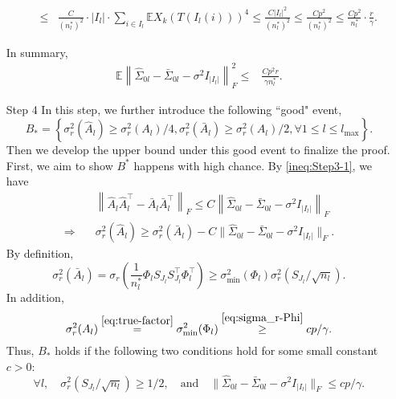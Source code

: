\documentclass[11pt]{article}
\newcommand{\0}{{\mathbf{0}}}
\newcommand{\1}{{\mathbf{1}}}
\begin{document}
\begin{enumerate}[leftmargin=*]
\begin{itemize}[leftmargin=*]
\begin{equation*}
\begin{split}
		\leq & \frac{C}{(n_l^\ast)^2} \cdot |I_l|\cdot  \sum_{i\in I_l} \mathbb{E} X_k(T(I_l(i)))^4 \leq \frac{C|I_l|^2}{(n_l^\ast)^2} \leq \frac{Cp^2}{(n_l^\ast)^2} \leq \frac{Cp^2}{n_l^\ast} \cdot \frac{r}{\gamma}.
		\end{split}
		\end{equation*}
	\end{itemize}
	In summary,
	\begin{equation}\label{ineq:hat_Sigma-Sigma-sigma}
	\begin{split}
	\mathbb{E}\left\|\hat{\Sigma}_{0l} - \bar{\Sigma}_{0l} - \sigma^2I_{|I_l|} \right\|_F^2 \leq & \frac{Cp^2r}{\gamma n_l^\ast}.
	\end{split}
	\end{equation}
	\item[Step 4] In this step, we further introduce the following ``good" event,
	\begin{equation}\label{eq:Bast-good-event}
	B_\ast = \left\{\sigma_r^2(\hat{A}_l) \geq \sigma_r^2(A_l)/4, \sigma_r^2(\bar{A}_l) \geq \sigma_r^2(A_l)/2, \forall 1\leq l\leq l_{\max}\right\}.
	\end{equation}
	Then we develop the upper bound under this good event to finalize the proof. First, we aim to show $B^\ast$ happens with high chance. By \eqref{ineq:Step3-1}, we have 
	\begin{equation*}
	\begin{split}
	& \left\|\hat{A}_l\hat{A}_l^\top - \bar{A}_l\bar{A}_l^\top\right\|_F \leq C\left\|\hat{\Sigma}_{0l} - \bar{\Sigma}_{0l} - \sigma^2 I_{|I_l|}\right\|_F\\
	\Rightarrow \quad & \sigma_r^2(\hat{A}_l) \geq \sigma_r^2(\bar{A}_l) - C\|\hat{\Sigma}_{0l} - \bar{\Sigma}_{0l} - \sigma^2 I_{|I_l|}\|_F.
	\end{split}
	\end{equation*}
	By definition, 
	$$\sigma_r^2(\bar{A}_l) = \sigma_r\left(\frac{1}{n_l^\ast}\Phi_l S_{J_l}S_{J_l}^\top \Phi_l^\top\right) \geq \sigma_{\min}^2(\Phi_l)\sigma_r^2(S_{J_l}/\sqrt{n_l}). $$
	In addition, 
	$$\sigma_r^2(A_l) \overset{\eqref{eq:true-factor}}{=} \sigma_{\min}^2(\Phi_l) \overset{\eqref{eq:sigma_r-Phi}}{\geq} cp/\gamma.$$
	Thus, $B_\ast$ holds if the following two conditions hold for some small constant $c>0$:
	\begin{equation}\label{eq:condition}
	\forall l, \quad \sigma_r^2(S_{J_l}/\sqrt{n_l}) \geq 1/2, \quad \text{and}\quad \|\hat{\Sigma}_{0l} - \bar{\Sigma}_{0l}-\sigma^2I_{|I_l|}\|_F \leq cp/\gamma.
	\end{equation}

\end{enumerate}
\end{document}

